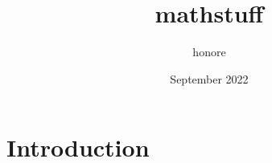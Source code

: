 \documentclass{article}
\title{mathstuff}
\author{honore }
\date{September 2022}
\begin{document}
\maketitle

\section{Introduction}
\end{document}
